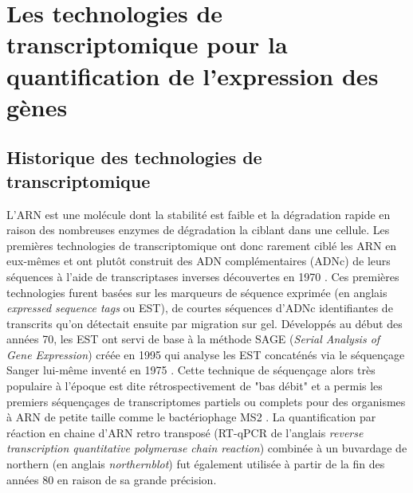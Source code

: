 \section{Les technologies de transcriptomique pour la quantification de l'expression des gènes}

\subsection{Historique des technologies de transcriptomique}

L'ARN est une molécule dont la stabilité est faible et la dégradation rapide en raison des nombreuses enzymes de dégradation la ciblant dans une cellule. Les premières technologies de transcriptomique ont donc rarement ciblé les ARN en eux-mêmes et ont plutôt construit des ADN complémentaires (ADNc) de leurs séquences à l'aide de transcriptases inverses découvertes en 1970 \cite{Temin1970Jun}. Ces premières technologies furent basées sur les marqueurs de séquence exprimée (en anglais \textit{expressed sequence tags} ou EST), de courtes séquences d'ADNc identifiantes de transcrits qu'on détectait ensuite par migration sur gel. Développés au début des années 70, les EST ont servi de base à la méthode SAGE (\textit{Serial Analysis of Gene Expression}) créée en 1995 \cite{Velculescu1995Oct} qui analyse les EST concaténés via le séquençage Sanger lui-même inventé en 1975 \cite{Sanger1975May}. Cette technique de séquençage alors très populaire à l'époque \cite{Marra1998Jan} est dite rétrospectivement de "bas débit" et a permis les premiers séquençages de transcriptomes partiels \cite{Jeppesen1970Apr} ou complets pour des organismes à ARN de petite taille comme le bactériophage MS2 \cite{Fiers1976Apr}. La quantification par réaction en chaine d'ARN retro transposé (RT-qPCR de l'anglais \textit{reverse transcription quantitative polymerase chain reaction}) combinée à un buvardage de northern (en anglais \textit{northernblot}) fut également utilisée à partir de la fin des années 80 en raison de sa grande précision\cite{Becker-Andre1989Nov}.

